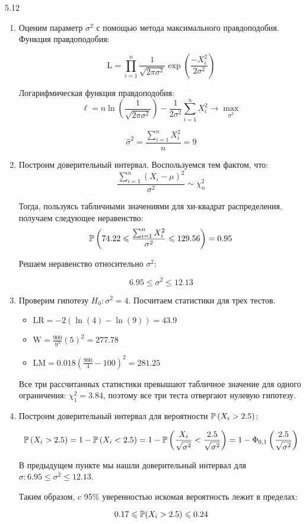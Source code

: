 \protect \hypertarget {soln:5.12}{}
\begin{solution}{{5.12}}
\begin{enumerate}
\item Оценим параметр $\sigma^2$ с помощью метода максимального правдоподобия. Функция правдоподобия:

\[\text{L} = \prod_{i=1}^{n} \frac{1}{\sqrt{2\pi\sigma^2}}\exp\left( \frac{- X_i ^2}{2\sigma^2}\right) \]

Логарифмическая функция правдоподобия:
\[
\ell = n \ln \left( \frac{1}{\sqrt{2\pi\sigma^2}}\right) - \frac{1}{2\sigma^2}\sum_{i=1}^{n}X_i^2 \to \max_{\sigma^2}
\]

\[\hat{\sigma}^2 = \frac{\sum_{i=1}^{n}X_i^2}{n} = 9\]

\item Построим доверительный интервал. Воспользуемся тем фактом, что:
\[\frac{\sum_{i=1}^{n}(X_i - \mu)^2}{\sigma^2} \sim \chi^2_n\]

Тогда, пользуясь табличными значениями для хи-квадрат распределения, получаем следующее неравенство:
\[\P\left( 74.22 \leqslant \frac{\sum_{i=1}^{n}X_i^2}{\sigma^2} \leqslant 129.56 \right) = 0.95 \]

Решаем неравенство относительно $\sigma^2$:

\[6.95 \leqslant \sigma^2 \leqslant 12.13\]

\item Проверим гипотезу $H_0: \sigma^2 = 4$. Посчитаем статистики для трех тестов.
\begin{itemize}
  \item $\text{LR} = -2\left(\ln(4) - \ln(9)\right) = 43.9$
    \item $\text{W} = \frac{900}{9^2}(5)^2 = 277.78$
    \item $\text{LM} = 0.018\left( \frac{900}{4}-100\right)^2 = 281.25$
\end{itemize}

Все три рассчитанных статистики превышают табличное значение для одного ограничения: $\chi^2_1 = 3.84$, поэтому все три теста отвергают нулевую гипотезу.

\item Построим доверительный интервал для вероятности $\P\left( X_i>2.5\right)$:

\[\P\left( X_i>2.5\right) = 1 - \P\left( X_i<2.5\right)  = 1 - \P\left(\frac{X_i}{\sqrt{\sigma^2}} < \frac{2.5}{\sqrt{\sigma^2}} \right) = 1 - \Phi_{0,1}\left( \frac{2.5}{\sqrt{\sigma^2}}\right) \]

В предыдущем пункте мы нашли доверительный интервал для $\sigma: 6.95 \leqslant \sigma^2 \leqslant 12.13$.

Таким образом, c 95\% уверенностью искомая вероятность лежит в пределах:

\[0.17 \leqslant \P(X_i>2.5) \leqslant 0.24\]
\end{enumerate}
\end{solution}
